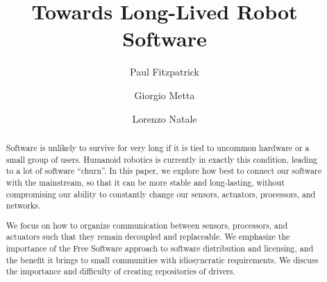 \begin{frontmatter}



\title{Towards Long-Lived Robot Software}


\author[at_iit]{Paul Fitzpatrick}
\author[at_iit,at_dist]{Giorgio Metta}
\author[at_iit]{Lorenzo Natale}

\address[at_iit]{
Italian Institute of Technology \\
Via Morego, 30 \\ 16163 Genova, Italy
}
\address[at_dist]{
LIRA-Lab, University of Genoa \\
Viale F. Causa, 13 \\
16145 Genova, Italy
}

\begin{abstract}

Software is unlikely to survive for very long if it is
tied to uncommon hardware or a small group of users.
Humanoid robotics is currently in exactly this condition,
leading to a lot of software ``churn''.
%
In this paper, we explore how best to connect our software with the
mainstream, so that it can be more stable and long-lasting,
without compromising our ability to constantly change our
sensors, actuators, processors, and networks.

We focus on how to organize communication between sensors, processors,
and actuators such that they remain decoupled and replaceable.
We emphasize the importance of the Free Software approach to software
distribution and licensing, and the benefit it brings to small
communities with idiosyncratic requirements.
%
%
We discuss the importance and difficulty of creating 
repositories of drivers.


\end{abstract}
\end{frontmatter}
